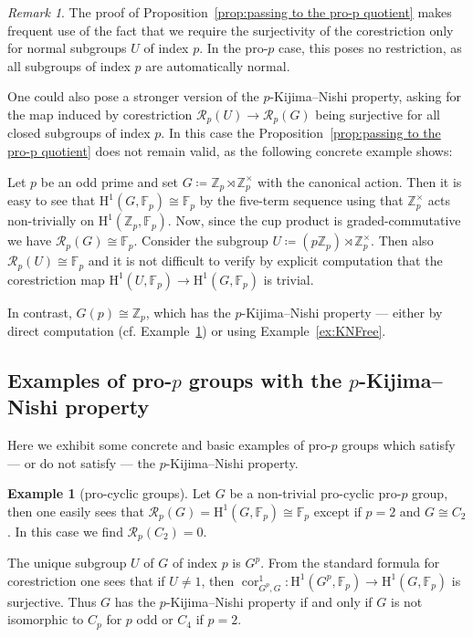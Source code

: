 \documentclass{amsart}
\theoremstyle{definition}
\newtheorem{ex}[thm]{Example}
\theoremstyle{remark}
\newtheorem{rem}[thm]{Remark}
\DeclareMathOperator{\cores}{cor}
\newcommand{\ZZ}{\mathbb{Z}}
\newcommand{\FF}{\mathbb{F}}
\newcommand{\calR}{\mathcal{R}}
\newcommand{\rmH}{\mathrm H}%
\begin{document}
\begin{rem}
    \label{rem: KN property with all subgroups}
    The proof of Proposition~\ref{prop:passing to the pro-p quotient} makes frequent use of the fact that we require the surjectivity of the corestriction only for normal subgroups $U$ of index $p$. In the pro-$p$ case, this poses no restriction, as all subgroups of index $p$ are automatically normal.

\noindent    One could also pose a stronger version of the $p$-Kijima--Nishi property, asking for the map induced by corestriction $\calR_p(U)\to \calR_p(G)$ being surjective for all closed subgroups of index $p$. In this case the Proposition~\ref{prop:passing to the pro-p quotient} does not remain valid, as the following concrete example shows:

\noindent    Let $p$ be an odd prime and set $G\coloneq \ZZ_p\rtimes\ZZ_p^\times$ with the canonical action. Then it is easy to see that $\rmH^1(G,\FF_p)\cong \FF_p$ by the five-term sequence using that $\ZZ_p^\times$ acts non-trivially on $\rmH^1(\ZZ_p,\FF_p)$. Now, since the cup product is graded-commutative we have $\calR_p(G)\cong \FF_p$. Consider the subgroup $U\coloneq (p\ZZ_p)\rtimes \ZZ_p^\times$. Then also $\calR_p(U)\cong \FF_p$ and it is not difficult to verify by explicit computation that the corestriction map $\rmH^1(U,\FF_p)\to \rmH^1(G,\FF_p)$ is trivial.

\noindent    In contrast, $G(p)\cong \ZZ_p$, which has the $p$-Kijima--Nishi property --- either by direct computation (cf. Example~\ref{ex:cyclic groups}) or using Example~\ref{ex:KNFree}.
\end{rem}

\subsection{Examples of pro-\texorpdfstring{$p$}{} groups with the \texorpdfstring{$p$}{}-Kijima--Nishi property}
\label{ssec:Examples for KN}
Here we exhibit some concrete and basic examples of pro-$p$ groups which satisfy --- or do not satisfy --- the $p$-Kijima--Nishi property.
\begin{ex}[pro-cyclic groups]
\label{ex:cyclic groups}
    Let $G$ be a non-trivial pro-cyclic pro-$p$ group, then one easily sees that $\calR_p(G)=\rmH^1(G,\FF_p)\cong \FF_p$ except if $p=2$ and $G\cong C_2$. In this case we find $\calR_p(C_2)=0$.

    The unique subgroup $U$ of $G$ of index $p$ is $G^p$. From the standard formula for corestriction one sees that if $U\neq 1$, then $\cores_{G^p,G}^1:\rmH^1(G^p,\FF_p)\to \rmH^1(G,\FF_p)$ is surjective. Thus $G$ has the $p$-Kijima--Nishi property if and only if $G$ is not isomorphic to $C_p$ for $p$ odd or $C_4$ if $p=2$. 
\end{ex}
\end{document}
